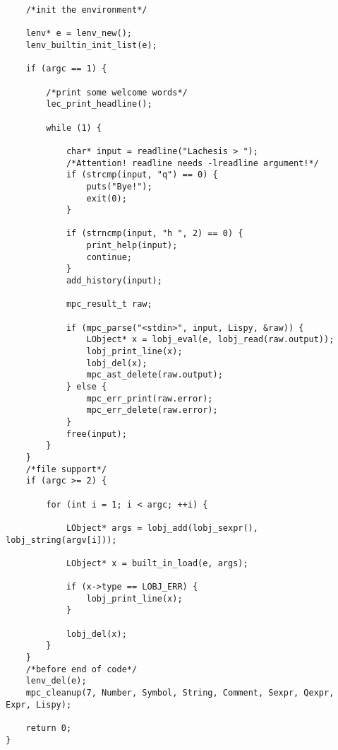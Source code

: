 \begin{verbatim}
    /*init the environment*/

    lenv* e = lenv_new();
    lenv_builtin_init_list(e);

    if (argc == 1) {

        /*print some welcome words*/
        lec_print_headline();

        while (1) {

            char* input = readline("Lachesis > ");
            /*Attention! readline needs -lreadline argument!*/
            if (strcmp(input, "q") == 0) {
                puts("Bye!");
                exit(0);
            }

            if (strncmp(input, "h ", 2) == 0) {
                print_help(input);
                continue;
            }
            add_history(input);

            mpc_result_t raw;

            if (mpc_parse("<stdin>", input, Lispy, &raw)) {
                LObject* x = lobj_eval(e, lobj_read(raw.output));
                lobj_print_line(x);
                lobj_del(x);
                mpc_ast_delete(raw.output);
            } else {
                mpc_err_print(raw.error);
                mpc_err_delete(raw.error);
            }
            free(input);
        }
    }
    /*file support*/
    if (argc >= 2) {

        for (int i = 1; i < argc; ++i) {

            LObject* args = lobj_add(lobj_sexpr(), lobj_string(argv[i]));

            LObject* x = built_in_load(e, args);

            if (x->type == LOBJ_ERR) {
                lobj_print_line(x);
            }

            lobj_del(x);
        }
    }
    /*before end of code*/
    lenv_del(e);
    mpc_cleanup(7, Number, Symbol, String, Comment, Sexpr, Qexpr, Expr, Lispy);

    return 0;
}
\end{verbatim}
